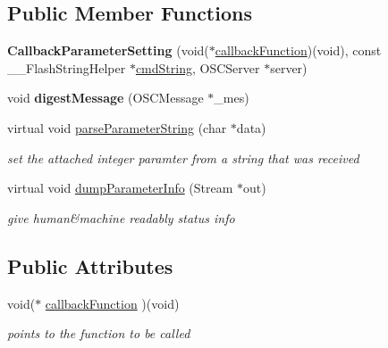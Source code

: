 \subsection*{Public Member Functions}
\begin{DoxyCompactItemize}
\item 
\hypertarget{class_callback_parameter_setting_a49dc3fcb528a1a9accad310e528a4bf5}{{\bfseries Callback\-Parameter\-Setting} (void($\ast$\hyperlink{class_callback_parameter_setting_acf933a084e75f2e026f8dce88f15c378}{callback\-Function})(void), const \-\_\-\-\_\-\-Flash\-String\-Helper $\ast$\hyperlink{class_abstract_parameter_setting_a038edb8c34265166b4d7927cf0ee2776}{cmd\-String}, O\-S\-C\-Server $\ast$server)}\label{class_callback_parameter_setting_a49dc3fcb528a1a9accad310e528a4bf5}

\item 
\hypertarget{class_callback_parameter_setting_aaf7d86f96d6f522f2661094b5fae454f}{void {\bfseries digest\-Message} (O\-S\-C\-Message $\ast$\-\_\-mes)}\label{class_callback_parameter_setting_aaf7d86f96d6f522f2661094b5fae454f}

\item 
\hypertarget{class_callback_parameter_setting_affc622e278342f3231941e623c0d0ad9}{virtual void \hyperlink{class_callback_parameter_setting_affc622e278342f3231941e623c0d0ad9}{parse\-Parameter\-String} (char $\ast$data)}\label{class_callback_parameter_setting_affc622e278342f3231941e623c0d0ad9}

\begin{DoxyCompactList}\small\item\em set the attached integer paramter from a string that was received \end{DoxyCompactList}\item 
\hypertarget{class_callback_parameter_setting_a1e5a275e4af43bf708e1b03d2b9ba1e3}{virtual void \hyperlink{class_callback_parameter_setting_a1e5a275e4af43bf708e1b03d2b9ba1e3}{dump\-Parameter\-Info} (Stream $\ast$out)}\label{class_callback_parameter_setting_a1e5a275e4af43bf708e1b03d2b9ba1e3}

\begin{DoxyCompactList}\small\item\em give human\&machine readably status info \end{DoxyCompactList}\end{DoxyCompactItemize}
\subsection*{Public Attributes}
\begin{DoxyCompactItemize}
\item 
\hypertarget{class_callback_parameter_setting_acf933a084e75f2e026f8dce88f15c378}{void($\ast$ \hyperlink{class_callback_parameter_setting_acf933a084e75f2e026f8dce88f15c378}{callback\-Function} )(void)}\label{class_callback_parameter_setting_acf933a084e75f2e026f8dce88f15c378}

\begin{DoxyCompactList}\small\item\em points to the function to be called \end{DoxyCompactList}\end{DoxyCompactItemize}



